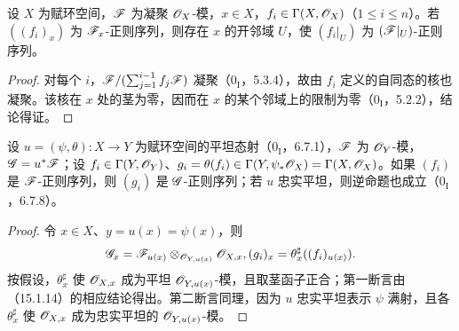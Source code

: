 设 $X$ 为赋环空间，$\mathscr F$ 为凝聚 $\mathscr O_X$-模，$x\in X$，$f_i\in\Gamma(X,\mathscr O_X)$（$1\leq i\leq n$）。若 $((f_i)_x)$ 为 $\mathscr F_x$-正则序列，则存在 $x$ 的开邻域 $U$，使 $(f_i|_U)$ 为 $(\mathscr F|_U)$-正则序列。
\begin{proof}
对每个 $i$，$\mathscr F/(\sum_{j=1}^{i-1}f_j\mathscr F)$ 凝聚（$0_{\mathrm I}$，5.3.4），故由 $f_i$ 定义的自同态的核也凝聚。该核在 $x$ 处的茎为零，因而在 $x$ 的某个邻域上的限制为零（$0_{\mathrm I}$，5.2.2），结论得证。
\end{proof}

设 $u=(\psi,\theta):X\to Y$ 为赋环空间的平坦态射（$0_{\mathrm I}$，6.7.1），$\mathscr F$ 为 $\mathscr O_Y$-模，$\mathscr G=u^*\mathscr F$；设 $f_i\in\Gamma(Y,\mathscr O_Y)$、$g_i=\theta(f_i)\in\Gamma(Y,\psi_*\mathscr O_X)=\Gamma(X,\mathscr O_X)$。如果 $(f_i)$ 是 $\mathscr F$-正则序列，则 $(g_i)$ 是 $\mathscr G$-正则序列；若 $u$ 忠实平坦，则逆命题也成立（$0_{\mathrm I}$，6.7.8）。
\begin{proof}
令 $x\in X$、$y=u(x)=\psi(x)$，则
\[
 \mathscr G_x=\mathscr F_{u(x)}\otimes_{\mathscr O_{Y,u(x)}}\mathscr O_{X,x},
 (g_i)_x=\theta_x^\sharp((f_i)_{u(x)}).
\]
按假设，$\theta_x^\sharp$ 使 $\mathscr O_{X,x}$ 成为平坦 $\mathscr O_{Y,u(x)}$-模，且取茎函子正合；第一断言由（15.1.14）的相应结论得出。第二断言同理，因为 $u$ 忠实平坦表示 $\psi$ 满射，且各 $\theta_x^\sharp$ 使 $\mathscr O_{X,x}$ 成为忠实平坦的 $\mathscr O_{Y,u(x)}$-模。
\end{proof}


